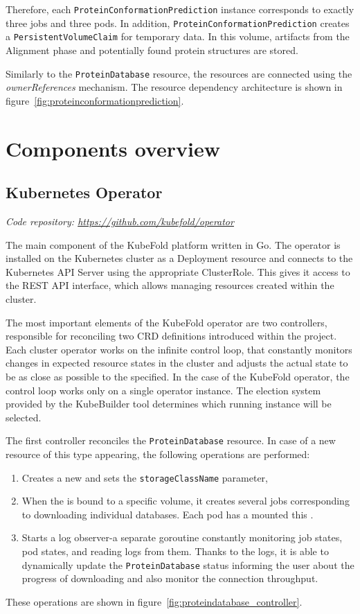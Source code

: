 Therefore, each \texttt{ProteinConformationPrediction} instance corresponds to exactly three jobs and three pods.
In addition, \texttt{ProteinConformationPrediction} creates a \texttt{PersistentVolumeClaim} for temporary data.
In this volume, artifacts from the Alignment phase and potentially found protein structures are stored.

Similarly to the \texttt{ProteinDatabase} resource, the resources are connected using the \textit{ownerReferences} mechanism.
The resource dependency architecture is shown in figure~\ref{fig:proteinconformationprediction}.


\section{Components overview}

\subsection{Kubernetes Operator}\label{subsec:component-operator}
\textit{Code repository: \url{https://github.com/kubefold/operator}}

The main component of the KubeFold platform written in Go.
The operator is installed on the Kubernetes cluster as a Deployment resource and connects to the Kubernetes API Server using the appropriate ClusterRole.
This gives it access to the REST API interface, which allows managing resources created within the cluster.

The most important elements of the KubeFold operator are two controllers, responsible for reconciling two CRD definitions introduced within the project.
Each cluster operator works on the infinite control loop, that constantly monitors changes in expected resource states in the cluster and adjusts the actual state to be as close as possible to the specified.
In the case of the KubeFold operator, the control loop works only on a single operator instance.
The election system provided by the KubeBuilder tool determines which running instance will be selected.

The first controller reconciles the \texttt{ProteinDatabase} resource.
In case of a new resource of this type appearing, the following operations are performed:
\begin{enumerate}
    \item Creates a new  and sets the \texttt{storageClassName} parameter,
    \item When the  is bound to a specific volume, it creates several jobs corresponding to downloading individual databases.
    Each pod has a mounted this .
    \item Starts a log observer-a separate goroutine constantly monitoring job states, pod states, and reading logs from them.
    Thanks to the logs, it is able to dynamically update the \texttt{ProteinDatabase} status informing the user about the progress of downloading and also monitor the connection throughput.
\end{enumerate}
These operations are shown in figure~\ref{fig:proteindatabase_controller}.

